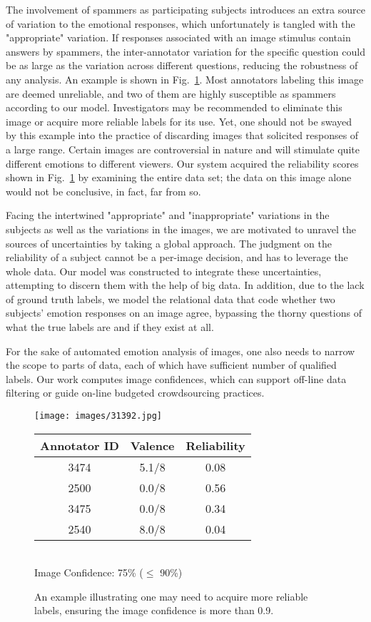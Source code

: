 \documentclass[10pt,journal,letterpaper,compsoc,twoside]{IEEEtran}
\begin{document}
{The involvement of spammers as participating subjects introduces an extra source of variation to the emotional responses, which unfortunately is tangled with the "appropriate" variation.} If responses associated with an image stimulus contain answers by spammers, the inter-annotator
variation for the specific question could be as large as the variation across different questions, reducing the robustness of any analysis. An example is shown in Fig.~\ref{fig:oneimage}. Most annotators labeling this image are deemed unreliable, and two of them are highly susceptible as spammers according to our model. 
Investigators may be recommended to eliminate this image or acquire more reliable labels for its use. {Yet, one should not be swayed by this example into the practice of discarding images that solicited responses of a large range. Certain images are controversial in nature and will stimulate quite different emotions to different viewers.  Our system acquired the reliability scores shown in Fig.~\ref{fig:oneimage} by examining the entire data set; the data on this image alone would not be conclusive, in fact, far from so.}

{Facing the intertwined "appropriate" and "inappropriate" variations in the subjects as well as the variations in the images, we are motivated to unravel the sources of uncertainties by taking a global approach. The judgment on the reliability of a subject cannot be a per-image decision, and has to leverage the whole data. Our model was constructed to integrate these uncertainties, attempting to discern them with the help of big data. In addition, due to the lack of ground truth labels, we model the relational data that code whether two subjects' emotion responses on an image agree, bypassing the thorny questions of what the true labels are and if they exist at all.   }


For the sake of automated emotion analysis of images, one also needs to narrow the scope to parts of data, each of which have sufficient number of qualified labels. Our work computes image confidences, which can support off-line data filtering or guide on-line budgeted crowdsourcing practices. 
\begin{figure}
\parbox{2.6cm}{
\texttt{[image: images/31392.jpg]}
}\hfill
\parbox{6cm}{
\begin{tabular}{ccc} 
Annotator ID & Valence & Reliability \\ \hline
3474 & 5.1/8 & 0.08 \\
2500 & 0.0/8 & 0.56 \\
3475 & 0.0/8 & 0.34\\
2540 & 8.0/8 & 0.04 \\
\end{tabular}\\

\quad Image Confidence: 75\% ($\le $ 90\%)
}
\caption{An example illustrating one may need to acquire more reliable labels,
ensuring the image confidence is more than 0.9.}\label{fig:oneimage}
\end{figure}
\end{document}
